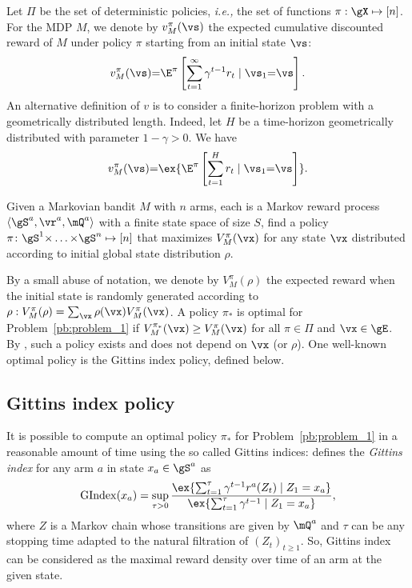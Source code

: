 Let $\Pi$ be the set of deterministic policies, \emph{i.e.,} the set of
functions $\pi:\gX\mapsto[n]$. For the MDP $M$, we denote by
$v_{M}^{\pi}(\vs)$ the expected cumulative discounted reward of ${M}$ under policy $\pi$ starting from an initial state $\vs$:
\[ v_{M}^\pi(\vs) {=}
\E^\pi\left[\sum_{t=1}^{\infty} \gamma^{t-1}r_t \mid \vs_1{=}\vs\right].\]
An alternative definition of $v$ is to consider a finite-horizon problem with a geometrically distributed length. Indeed, let $H$ be a time-horizon geometrically distributed with parameter $1-\gamma>0$. We have
\begin{equation}
    \label{eq:V-vs_R}
    v_{M}^\pi(\vs)  {=} \ex{\E^\pi\left[\sum_{t=1}^{H} r_t \mid \vs_1{=}\vs\right]}.
\end{equation}
\begin{prob}
\label{pb:problem_1}
Given a Markovian bandit $M$ with $n$ arms, each is a Markov reward process $\langle\gS^a,\vr^a,\mQ^a\rangle$ with a finite state space of size $S$, find a policy $\pi\colon\gS^1{\times}\dots{\times}\gS^n\mapsto[n]$ that maximizes $V_{M}^\pi(\vx)$ for any state $\vx$ distributed according to initial global state distribution $\rho$.
\end{prob}

By a small abuse of notation, we denote by $V_M^\pi(\rho)$ the expected reward when the initial state is randomly generated according to $\rho: V_M^\pi(\rho)=\sum_{\vx}\rho(\vx)V_{M}^\pi(\vx)$.
A policy
$\pi_*$ is optimal for Problem~\ref{pb:problem_1} if $ V_{M}^{\pi_*}(\vx) \ge V_{M}^\pi(\vx) $ for all
$\pi\in\Pi$ and $\vx\in\gE$. By \cite{puterman2014markov},
such a policy exists and does not depend on $\vx$ (or $\rho$). One well-known optimal policy is the Gittins index policy, defined below. 

\subsection{Gittins index policy}
\label{ssec:Gittins}

It is possible to compute an optimal
policy $\pi_*$ for Problem~\ref{pb:problem_1} in a reasonable amount of time using the so called Gittins indices:
\cite{gittins1979bandit} defines the \emph{Gittins index} for any arm $a$ in state $x_a\in\gS^a$ as 
\begin{equation}
    \label{eq:eq_Gindex}
    \mathrm{GIndex}(x_a)=\sup_{\tau>0}\frac{\ex{\sum_{t=1}^{\tau}\gamma^{t-1}r^a(Z_{t}) \mid Z_{1}=x_a}}{\ex{\sum_{t=1}^{\tau}\gamma^{t-1}\mid Z_{1}=x_a}},
\end{equation}
where $Z$ is a Markov chain whose transitions are given by $\mQ^a$ and $\tau$ can
be any stopping time adapted to the natural filtration of $(Z_t)_{t\ge1}$. So, Gittins index can be considered as the maximal reward density over time of an arm at the given state.

